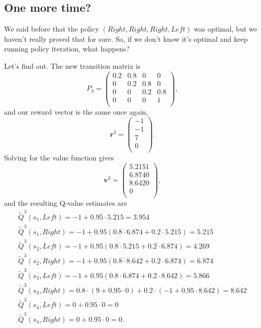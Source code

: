 \documentclass[a4paper]{article}
\begin{document}
\subsection{One more time?}
We said before that the policy $(Right, Right, Right, Left)$ was optimal,
but we haven't really proved that for sure.
So, if we don't know it's optimal and keep running policy iteration,
what happens?

Let's find out.
The new transition matrix is
\begin{equation*}
  P_3 =
  \begin{pmatrix}
      0.2 & 0.8 & 0   & 0   \\
      0   & 0.2 & 0.8 & 0   \\
      0   & 0   & 0.2 & 0.8 \\
      0   & 0   & 0   & 1   \\
  \end{pmatrix} ,
\end{equation*}
and our reward vector is the same once again,
\begin{equation*}
  \mathbf{r}^3 = \begin{pmatrix}
    -1 \\ -1 \\ 7 \\ 0 \\
  \end{pmatrix} .
\end{equation*}
Solving for the value function gives
\begin{equation*}
  \mathbf{v}^3 = \begin{pmatrix}
    5.2151 \\ 6.8740 \\ 8.6420 \\ 0 \\
  \end{pmatrix} ,
\end{equation*}
and the resulting Q-value estimates are
\begin{gather*}
  \widetilde{Q}^3(s_1, Left)  = -1 + 0.95 \cdot 5.215 = 3.954 \\
  \widetilde{Q}^3(s_1, Right) = -1 + 0.95 (0.8 \cdot 6.874 + 0.2 \cdot 5.215) = 5.215 \\
  \widetilde{Q}^3(s_2, Left)  = -1 + 0.95 (0.8 \cdot 5.215 + 0.2 \cdot 6.874) = 4.269 \\
  \widetilde{Q}^3(s_2, Right) = -1 + 0.95 (0.8 \cdot 8.642 + 0.2 \cdot 6.874) = 6.874 \\
  \widetilde{Q}^3(s_3, Left)  = -1 + 0.95 (0.8 \cdot 6.874 + 0.2 \cdot 8.642) = 5.866 \\
  \widetilde{Q}^3(s_3, Right) = 0.8 \cdot (9 + 0.95 \cdot 0) + 0.2 \cdot (-1 + 0.95 \cdot 8.642) = 8.642 \\
  \widetilde{Q}^3(s_4, Left)  = 0 + 0.95 \cdot 0 = 0 \\
  \widetilde{Q}^3(s_4, Right) = 0 + 0.95 \cdot 0 = 0 .
\end{gather*}
\end{document}
